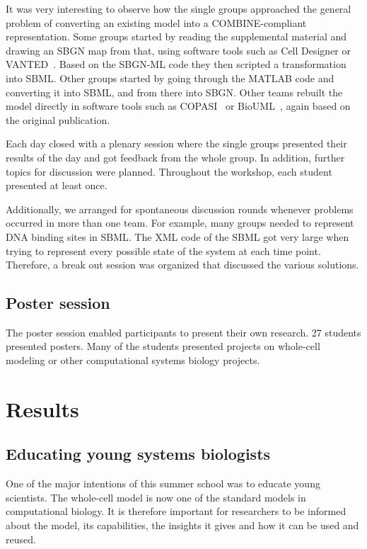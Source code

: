 \documentclass[journal,transmag]{IEEEtran}
\begin{document}
It was very  interesting to observe how the single groups  approached the general problem of converting an existing model into a COMBINE-compliant representation. 
Some groups started by reading the supplemental material and drawing an SBGN map from that, using software tools such as  Cell Designer \cite{funahashi2008celldesigner} or VANTED~\cite{Rohn2012}. 
Based on the SBGN-ML code they then scripted a transformation into SBML. 
Other groups started by going through the MATLAB code and converting it into SBML, and from there into SBGN. 
Other teams rebuilt the model directly in software tools such as  COPASI~\cite{Mendes2009} or BioUML~\cite{Kolpakov2006}, again based on the original publication.  

Each day closed with  a plenary session where the single groups presented their results of the day and got feedback from the whole group. In addition, further topics for discussion were planned.
Throughout the workshop, each student presented at least once.  

Additionally, we arranged for spontaneous discussion rounds whenever problems occurred in more than one team. 
For example, many groups needed to represent DNA binding sites in SBML. 
The XML code of the SBML got very large when trying to represent every possible state of the system at each time point. 
Therefore, a break out session was organized that discussed the various solutions. 

\subsection{Poster session}
The poster session enabled participants to present their own research. 
27 students presented posters. Many of the students presented projects on whole-cell modeling or other computational systems biology projects.

\section{Results}

\subsection{Educating young systems biologists}
One of the major intentions of this summer school was to educate young scientists. 
The whole-cell model is now one of the standard models in computational biology. 
It is therefore  important for researchers to be informed about the model, its capabilities, the insights it gives and how it can be used and reused. 
\end{document}
